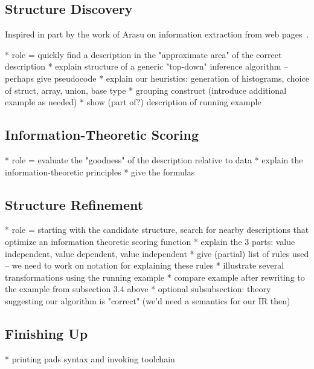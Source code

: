  




\subsection {Structure Discovery}

Inspired in part by the work of Arasu on
information extraction from web pages~\cite{arasu+:sigmod03}. 

    *  role = quickly find a description in the "approximate area" of the correct description
    * explain structure of a generic "top-down" inference algorithm -- perhaps give pseudocode
    * explain our heuristics: generation of histograms, choice of struct, array, union, base type
    * grouping construct (introduce additional example as needed)
    * show (part of?) description of running example 

\subsection {Information-Theoretic Scoring}

    *  role = evaluate the "goodness" of the description relative to data
    * explain the information-theoretic principles
    * give the formulas 

\subsection {Structure Refinement}

%

    *  role = starting with the candidate structure, search for nearby descriptions that optimize an information theoretic scoring function
    * explain the 3 parts: value independent, value dependent, value independent
    * give (partial) list of rules used -- we need to work on notation for explaining these rules
    * illustrate several transformations using the running example
    * compare example after rewriting to the example from subsection 3.4 above
    * optional subsubsection: theory suggesting our algorithm is "correct" (we'd need a semantics for our IR then)

 

\subsection {Finishing Up}

    * printing pads syntax and invoking toolchain
